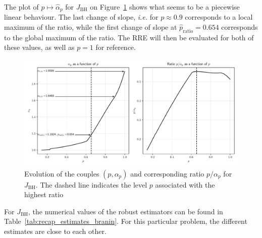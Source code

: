 \documentclass[preprint, review, 1p]{elsarticle}
\newcommand{\RRE}{RRE}
\newcommand{\checkap}{{\alpha}_p}
\newcommand{\checka}{{\alpha}}
\newcommand{\JBH}{J_{\mathrm{BH}}}
\newlength{\onehalfcolumn}
\begin{document}
 The plot of $p\mapsto \hat{\checka}_p$ for $\JBH$ on Figure~\ref{fig:ratio_BH} shows what seems to be a piecewise linear behaviour. The last change of slope, \textit{i.e.} for $p\approx 0.9$ corresponds to a local maximum of the ratio, while the first change of slope at $\hat{p}_{\mathrm{ratio}}=0.654$ corresponds to the global maximum of the ratio. The \RRE{} will then be evaluated for both of these values, as well as $p=1$ for reference.
 
 \begin{figure}[!ht]
   \centering
\includegraphics[width=\onehalfcolumn]{Figures/FIG06.pdf}
\caption{Evolution of the couples $(p,\checkap)$ and corresponding ratio $p/\checkap$ for $\JBH$. The dashed line indicates the level $p$ associated with the highest ratio}
\label{fig:ratio_BH}
\end{figure}


 For $\JBH$, the numerical values of the robust estimators can be found in Table~\ref{tab:recap_estimates_branin}. For this particular problem, the different estimates are close to each other.
 
\end{document}
